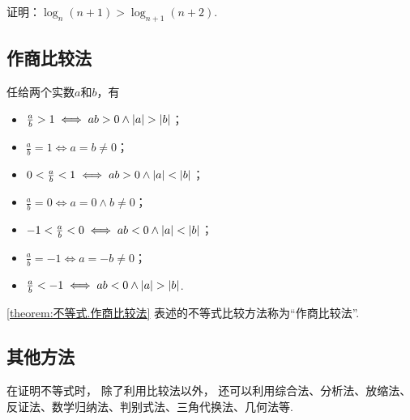 \begin{example}
证明：\(\log_n(n+1)>\log_{n+1}(n+2)\).
\end{example}

\subsection{作商比较法}
\begin{theorem}\label{theorem:不等式.作商比较法}
任给两个实数\(a\)和\(b\)，有\begin{itemize}
	\item \(\frac{a}{b} > 1 \iff ab > 0 \land \abs{a} > \abs{b}\)；
	\item \(\frac{a}{b} = 1 \iff a = b \neq 0\)；
	\item \(0 < \frac{a}{b} < 1 \iff ab > 0 \land \abs{a} < \abs{b}\)；
	\item \(\frac{a}{b} = 0 \iff a = 0 \land b \neq 0\)；
	\item \(-1 < \frac{a}{b} < 0 \iff ab < 0 \land \abs{a} < \abs{b}\)；
	\item \(\frac{a}{b} = -1 \iff a = -b \neq 0\)；
	\item \(\frac{a}{b} < -1 \iff ab < 0 \land \abs{a} > \abs{b}\).
\end{itemize}
\end{theorem}
\cref{theorem:不等式.作商比较法} 表述的不等式比较方法称为“作商比较法”.

\subsection{其他方法}
在证明不等式时，
除了利用比较法以外，
还可以利用综合法、分析法、放缩法、反证法、数学归纳法、判别式法、三角代换法、几何法等.
